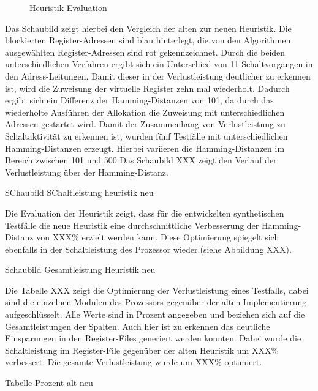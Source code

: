 \begin{figure}[H] 
	\centering
	
	\caption{Heuristik Evaluation}
	\label{fig:heuristik_eval}
\end{figure}
Das Schaubild zeigt hierbei den Vergleich der alten zur neuen Heuristik. Die blockierten Register-Adressen sind blau hinterlegt, die von den Algorithmen ausgewählten Register-Adressen sind rot gekennzeichnet. Durch die beiden unterschiedlichen Verfahren ergibt sich ein Unterschied von 11 Schaltvorgängen in den Adress-Leitungen. Damit dieser in der Verlustleistung deutlicher zu erkennen ist, wird die Zuweisung der virtuelle Register zehn mal wiederholt. Dadurch ergibt sich ein Differenz der Hamming-Distanzen von 101, da durch das wiederholte Ausführen der Allokation die Zuweisung mit unterschiedlichen Adressen gestartet wird.
Damit der Zusammenhang von Verlustleistung zu Schaltaktivität zu erkennen ist, wurden fünf Testfälle mit unterschiedlichen Hamming-Distanzen erzeugt. Hierbei variieren die Hamming-Distanzen im Bereich zwischen 101 und 500 Das Schaubild XXX zeigt den Verlauf der Verlustleistung über der Hamming-Distanz. 

SChaubild SChaltleistung heuristik neu 

Die Evaluation der Heuristik zeigt, dass für die entwickelten synthetischen Testfälle die neue Heuristik eine durchschnittliche Verbesserung der Hamming-Distanz von XXX\% erzielt werden kann. Diese Optimierung spiegelt sich ebenfalls in der Schaltleistung des Prozessor wieder.(siehe Abbildung XXX).

 Schaubild Gesamtleistung Heuristik neu

Die Tabelle XXX zeigt die Optimierung der Verlustleistung eines Testfalls, dabei sind die einzelnen Modulen des Prozessors gegenüber der alten Implementierung aufgeschlüsselt. Alle Werte sind in Prozent angegeben und beziehen sich auf die Gesamtleistungen der Spalten. Auch hier ist zu erkennen das deutliche Einsparungen in den Register-Files generiert werden konnten. Dabei wurde die Schaltleistung im Register-File gegenüber der alten Heuristik um XXX\% verbessert. Die gesamte Verlustleistung wurde um XXX\% optimiert. 

Tabelle Prozent alt neu

